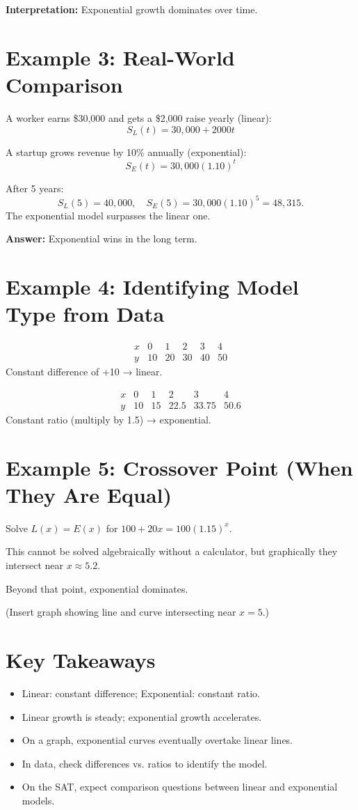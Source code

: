\documentclass[12pt]{article}
\begin{document}
\textbf{Interpretation:} Exponential growth dominates over time.

\section*{Example 3: Real-World Comparison}

A worker earns \$30,000 and gets a \$2,000 raise yearly (linear):
\[
S_L(t) = 30{,}000 + 2000t
\]

A startup grows revenue by 10\% annually (exponential):
\[
S_E(t) = 30{,}000(1.10)^t
\]

After 5 years:
\[
S_L(5) = 40{,}000, \quad S_E(5) = 30{,}000(1.10)^5 = 48{,}315.
\]
The exponential model surpasses the linear one.

\textbf{Answer:} Exponential wins in the long term.

\section*{Example 4: Identifying Model Type from Data}

\[
\begin{array}{c|ccccc}
x & 0 & 1 & 2 & 3 & 4 \\ \hline
y & 10 & 20 & 30 & 40 & 50
\end{array}
\]
Constant difference of +10 → linear.

\[
\begin{array}{c|ccccc}
x & 0 & 1 & 2 & 3 & 4 \\ \hline
y & 10 & 15 & 22.5 & 33.75 & 50.6
\end{array}
\]
Constant ratio (multiply by 1.5) → exponential.

\section*{Example 5: Crossover Point (When They Are Equal)}

Solve \(L(x) = E(x)\) for \(100 + 20x = 100(1.15)^x.\)

This cannot be solved algebraically without a calculator, but graphically they intersect near \(x \approx 5.2.\)

Beyond that point, exponential dominates.

(Insert graph showing line and curve intersecting near \(x = 5\).)

\section*{Key Takeaways}
\begin{itemize}
  \item Linear: constant difference; Exponential: constant ratio.
  \item Linear growth is steady; exponential growth accelerates.
  \item On a graph, exponential curves eventually overtake linear lines.
  \item In data, check differences vs. ratios to identify the model.
  \item On the SAT, expect comparison questions between linear and exponential models.
\end{itemize}
\end{document}
